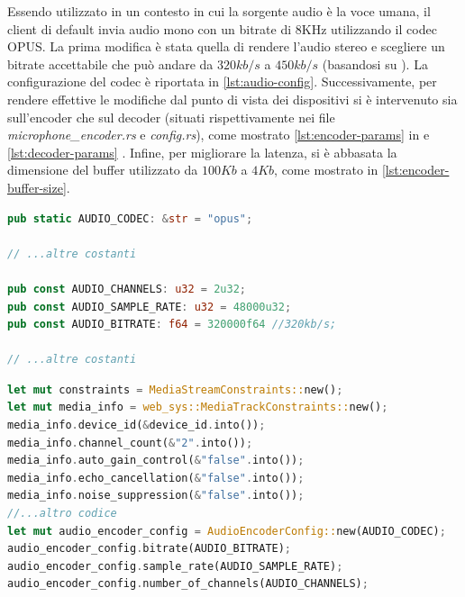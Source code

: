 \documentclass{article}
\begin{document}
Essendo utilizzato in un contesto in cui la sorgente audio è la voce umana, il 
client di default invia audio mono con un bitrate di 8KHz utilizzando il codec OPUS. La 
prima modifica è stata quella di rendere l'audio stereo e scegliere un bitrate accettabile
che può andare da $320 kb/s$ a $450 kb/s$ (basandosi su \cite{rfc6716}). La configurazione
del codec è riportata in \cref{lst:audio-config}. Successivamente, per rendere effettive le modifiche dal punto 
di vista dei dispositivi si è intervenuto sia sull'encoder che sul decoder (situati 
rispettivamente nei file \textit{microphone\_encoder.rs} e \textit{config.rs}), 
come mostrato \cref{lst:encoder-params} in e \cref{lst:decoder-params} . Infine, per migliorare la latenza, si è
abbasata la dimensione del buffer utilizzato da $100Kb$ a $4Kb$, come mostrato in
\cref{lst:encoder-buffer-size}. 

\begin{lstlisting}[language=Rust, style=boxed, label={lst:audio-config}, captionpos=b,caption={Configurazione utilizzata per trasmettere l'audio}]
pub static AUDIO_CODEC: &str = "opus";

// ...altre costanti

pub const AUDIO_CHANNELS: u32 = 2u32;
pub const AUDIO_SAMPLE_RATE: u32 = 48000u32;
pub const AUDIO_BITRATE: f64 = 320000f64 //320kb/s;

// ...altre costanti
\end{lstlisting}
\begin{lstlisting}[language=Rust, style=boxed, label={lst:encoder-params}, captionpos=b,caption={Configurazione audio stereo per l'encoder OPUS}]
let mut constraints = MediaStreamConstraints::new();
let mut media_info = web_sys::MediaTrackConstraints::new();
media_info.device_id(&device_id.into());
media_info.channel_count(&"2".into());
media_info.auto_gain_control(&"false".into());
media_info.echo_cancellation(&"false".into());
media_info.noise_suppression(&"false".into());
//...altro codice
let mut audio_encoder_config = AudioEncoderConfig::new(AUDIO_CODEC);
audio_encoder_config.bitrate(AUDIO_BITRATE);
audio_encoder_config.sample_rate(AUDIO_SAMPLE_RATE);
audio_encoder_config.number_of_channels(AUDIO_CHANNELS);

\end{lstlisting}
\end{document}
